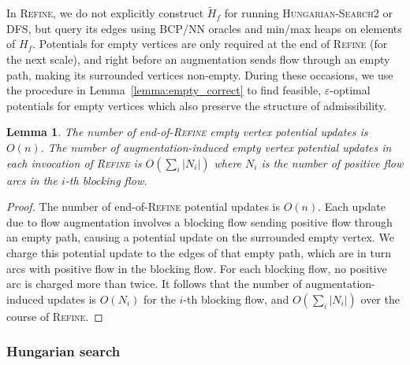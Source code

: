 \documentclass[11pt]{article}
\def\eps{\varepsilon}
\theoremstyle{plain}
\newtheorem{lemma}{Lemma}[section]
\numberwithin{figure}{section}
\begin{document}
In \textsc{Refine}, we do not explicitly construct $\tilde{H}_f$ for running
\textsc{Hungarian-Search2} or \textsc{DFS}, but query its edges using BCP/NN
oracles and min/max heaps on elements of $H_f$.
Potentials for empty vertices are only required at the end of \textsc{Refine}
(for the next scale), and right before an augmentation sends flow through an
empty path, making its surrounded vertices non-empty.
During these occasions, we use the procedure in Lemma~\ref{lemma:empty_correct}
to find feasible, $\eps$-optimal potentials for empty vertices which
also preserve the structure of admissibility.

\begin{lemma}
\label{lemma:empty_updates}
The number of end-of-\textsc{Refine} empty vertex potential updates is $O(n)$.
The number of augmentation-induced empty vertex potential updates in each
invocation of \textsc{Refine} is $O(\sum_i|N_i|)$ where $N_i$ is the number
of positive flow arcs in the $i$-th blocking flow.
\end{lemma}

\begin{proof}
The number of end-of-\textsc{Refine} potential updates is $O(n)$.
Each update due to flow augmentation involves a blocking flow sending positive
flow through an empty path, causing a potential update on the surrounded
empty vertex.
We charge this potential update to the edges of that empty path, which are in
turn arcs with positive flow in the blocking flow.
For each blocking flow, no positive arc is charged more than twice.
It follows that the number of augmentation-induced updates is $O(N_i)$ for the
$i$-th blocking flow, and $O(\sum_i|N_i|)$ over the course of \textsc{Refine}.
\end{proof}


\subsubsection{Hungarian search}
\end{document}
